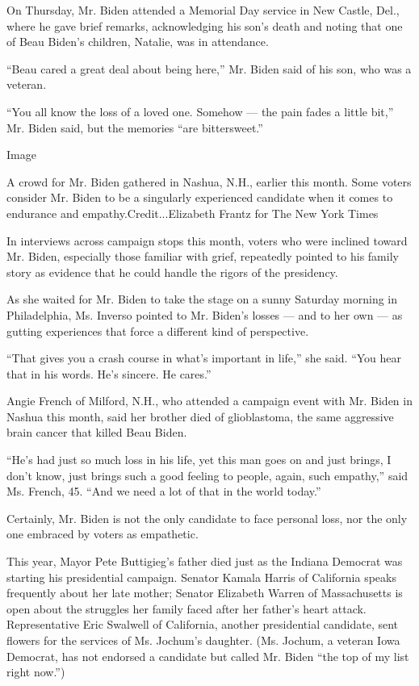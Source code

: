 On Thursday, Mr. Biden attended a Memorial Day service in New Castle,
Del., where he gave brief remarks, acknowledging his son's death and
noting that one of Beau Biden's children, Natalie, was in attendance.

``Beau cared a great deal about being here,'' Mr. Biden said of his son,
who was a veteran.

``You all know the loss of a loved one. Somehow --- the pain fades a
little bit,'' Mr. Biden said, but the memories ``are bittersweet.''

Image

A crowd for Mr. Biden gathered in Nashua, N.H., earlier this month. Some
voters consider Mr. Biden to be a singularly experienced candidate when
it comes to endurance and empathy.Credit...Elizabeth Frantz for The New
York Times

In interviews across campaign stops this month, voters who were inclined
toward Mr. Biden, especially those familiar with grief, repeatedly
pointed to his family story as evidence that he could handle the rigors
of the presidency.

As she waited for Mr. Biden to take the stage on a sunny Saturday
morning in Philadelphia, Ms. Inverso pointed to Mr. Biden's losses ---
and to her own --- as gutting experiences that force a different kind of
perspective.

``That gives you a crash course in what's important in life,'' she said.
``You hear that in his words. He's sincere. He cares.''

Angie French of Milford, N.H., who attended a campaign event with Mr.
Biden in Nashua this month, said her brother died of glioblastoma, the
same aggressive brain cancer that killed Beau Biden.

``He's had just so much loss in his life, yet this man goes on and just
brings, I don't know, just brings such a good feeling to people, again,
such empathy,'' said Ms. French, 45. ``And we need a lot of that in the
world today.''

Certainly, Mr. Biden is not the only candidate to face personal loss,
nor the only one embraced by voters as empathetic.

This year, Mayor Pete Buttigieg's father died just as the Indiana
Democrat was starting his presidential campaign. Senator Kamala Harris
of California speaks frequently about her late mother; Senator Elizabeth
Warren of Massachusetts is open about the struggles her family faced
after her father's heart attack. Representative Eric Swalwell of
California, another presidential candidate, sent flowers for the
services of Ms. Jochum's daughter. (Ms. Jochum, a veteran Iowa Democrat,
has not endorsed a candidate but called Mr. Biden ``the top of my list
right now.'')

